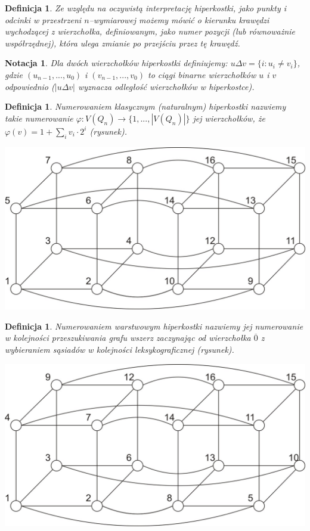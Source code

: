 \documentclass{pracamgr}
\newtheorem{note}[theorem]{Notacja}
\newtheorem{defi}[theorem]{Definicja}
\begin{document}
    \begin{defi}\label{kierunek krawędzi}
     Ze względu na oczywistą interpretację hiperkostki, jako punkty i odcinki w przestrzeni $n$--wymiarowej możemy mówić o \emph{kierunku}
     krawędzi wychodzącej z wierzchołka, definiowanym, jako numer pozycji (lub równoważnie współrzędnej), która ulega zmianie po przejściu przez tę krawędź.
    \end{defi}
    \begin{note}\label{delta wierzcholkow}
     Dla dwóch wierzchołków hiperkostki definiujemy:
     $u\Delta v=\{i:u_i\neq v_i\}$, gdzie $(u_{n-1},...,u_{0})$ i $(v_{n-1},...,v_{0})$ to ciągi binarne wierzchołków $u$ i $v$ odpowiednio
     ($|u\Delta v|$ wyznacza odległość wierzchołków w hiperkostce).
    \end{note}
    \begin{defi}\label{numerowanie klasyczne}
     \emph{Numerowaniem klasycznym (naturalnym)} hiperkostki nazwiemy takie numerowanie $\varphi:V(Q_n)\rightarrow\{1,...,|V(Q_n)|\}$ jej wierzchołków, że
     $\varphi(v)=1+\sum_{i}v_i\cdot2^i$ (rysunek).
    \end{defi}
    \begin{center}
     \includegraphics[scale=0.6]{img/Q_4_klasyczne.jpg}
    \end{center}
    \begin{defi}\label{numerowanie warstwowe}
     \emph{Numerowaniem warstwowym} hiperkostki nazwiemy jej numerowanie w kolejności przeszukiwania grafu wszerz zaczynając od wierzchołka $\overline{0}$
     z wybieraniem sąsiadów w kolejności leksykograficznej (rysunek).
    \end{defi}
    \begin{center}
    \includegraphics[scale=0.6]{img/Q_4_warstwowe.jpg}
   \end{center}   
\end{document}
